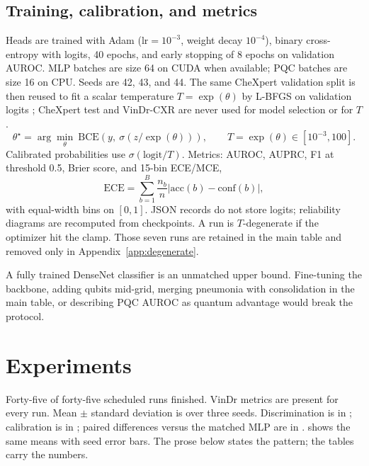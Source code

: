 \documentclass{midl} %
\begin{document}
\subsection{Training, calibration, and metrics}

Heads are trained with Adam \cite{kingma2015adam} ($\mathrm{lr}=10^{-3}$, weight decay $10^{-4}$), binary cross-entropy with logits, 40 epochs, and early stopping of 8 epochs on validation AUROC. MLP batches are size 64 on CUDA when available; PQC batches are size 16 on CPU. Seeds are 42, 43, and 44. The same CheXpert validation split is then reused to fit a scalar temperature $T=\exp(\theta)$ by L-BFGS on validation logits \cite{guo2017calibration}; CheXpert test and VinDr-CXR are never used for model selection or for $T$.
\begin{equation}
\label{eq:temperature}
\theta^{\star}=\arg\min_{\theta}\ \mathrm{BCE}\!\left(y,\ \sigma\!\left(z/\exp(\theta)\right)\right),\qquad T=\exp(\theta)\in[10^{-3},100].
\end{equation}
Calibrated probabilities use $\sigma(\mathrm{logit}/T)$. Metrics: AUROC, AUPRC, F1 at threshold 0.5, Brier score, and 15-bin ECE/MCE,
\begin{equation}
\label{eq:ece}
\mathrm{ECE}=\sum_{b=1}^{B}\frac{n_b}{n}\bigl|\mathrm{acc}(b)-\mathrm{conf}(b)\bigr|,
\end{equation}
with equal-width bins on $[0,1]$. JSON records do not store logits; reliability diagrams are recomputed from checkpoints. A run is $T$-degenerate if the optimizer hit the clamp. Those seven runs are retained in the main table and removed only in Appendix~\ref{app:degenerate}.

A fully trained DenseNet classifier is an unmatched upper bound. Fine-tuning the backbone, adding qubits mid-grid, merging pneumonia with consolidation in the main table, or describing PQC AUROC as quantum advantage would break the protocol.

\section{Experiments}

Forty-five of forty-five scheduled runs finished. VinDr metrics are present for every run. Mean $\pm$ standard deviation is over three seeds. Discrimination is in ; calibration is in ; paired differences versus the matched MLP are in .  shows the same means with seed error bars. The prose below states the pattern; the tables carry the numbers.
\end{document}
